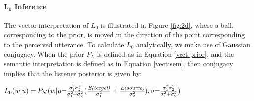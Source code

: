 \documentclass[9pt,twocolumn,twoside,lineno]{pnas-new}
\begin{document}
{	%


	\paragraph{$\mathbf{L_0}$ Inference}
	The vector interpretation of $L_0$ is illustrated in Figure \ref{fig:2d}, where a ball, corresponding to the prior, is moved in the direction of the point corresponding to the perceived utterance. To calculate $L_0$ analytically, we make use of Gaussian conjugacy. When the prior $P_L$ is defined as in Equation \ref{vect:prior}, and the semantic interpretation is defined as in Equation \ref{vect:sem}, then conjugacy implies that the listener posterior is given by:

	 \begin{examples}
	\item $L_0(w|u)=P_{\mathcal{N}}(w\vert\mu\! \! =\! \! \frac{\sigma_1^2 \sigma_2^2}{\sigma_1^2+\sigma_2^2}(\frac{{\textrm{\emph{E(target)}}}}{\sigma_1^2}+\frac{{\textrm{\emph{E(source)}}}}{\sigma_2^2}), \sigma \! \!=\! \! \frac{\sigma_1^2 \sigma_2^2}{\sigma_1^2+\sigma_2^2})$  \label{eq:L0-inference}
	 \end{examples}








}
\end{document}

